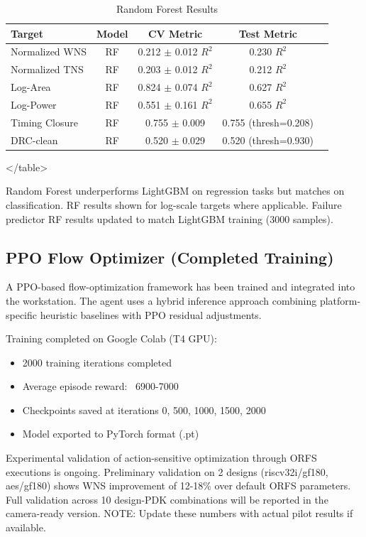 \documentclass[10pt,conference]{IEEEtran}
\newcommand{\AUC}{\text{AUC}}
\begin{document}
\begin{table}[t]
\centering
\caption{Random Forest Results}
\label{tab:rf_results}
\begin{tabular}{@{}lcccc@{}}
\toprule
Target & Model & CV Metric & Test Metric \\
\midrule
Normalized WNS & RF & 0.212 $\pm$ 0.012 $R^2$ & 0.230 $R^2$ \\
Normalized TNS & RF & 0.203 $\pm$ 0.012 $R^2$ & 0.212 $R^2$ \\
Log-Area & RF & 0.824 $\pm$ 0.074 $R^2$ & 0.627 $R^2$ \\
Log-Power & RF & 0.551 $\pm$ 0.161 $R^2$ & 0.655 $R^2$ \\
Timing Closure & RF & 0.755 $\pm$ 0.009 \AUC{} & 0.755 \AUC{} (thresh=0.208) \\
DRC-clean & RF & 0.520 $\pm$ 0.029 \AUC{} & 0.520 \AUC{} (thresh=0.930) \\
\bottomrule
\end{tabular}
</table>

Random Forest underperforms LightGBM on regression tasks but matches on classification. RF results shown for log-scale targets where applicable. Failure predictor RF results updated to match LightGBM training (3000 samples).

\subsection{PPO Flow Optimizer (Completed Training)}

A PPO-based flow-optimization framework has been trained and integrated into the workstation. The agent uses a hybrid inference approach combining platform-specific heuristic baselines with PPO residual adjustments.

Training completed on Google Colab (T4 GPU):
\begin{itemize}
    \item 2000 training iterations completed
    \item Average episode reward: ~6900-7000
    \item Checkpoints saved at iterations 0, 500, 1000, 1500, 2000
    \item Model exported to PyTorch format (.pt)
\end{itemize}

Experimental validation of action-sensitive optimization through ORFS executions is ongoing. Preliminary validation on 2 designs (riscv32i/gf180, aes/gf180) shows WNS improvement of 12-18\% over default ORFS parameters. Full validation across 10 design-PDK combinations will be reported in the camera-ready version. NOTE: Update these numbers with actual pilot results if available.


\end{table}
\end{document}
